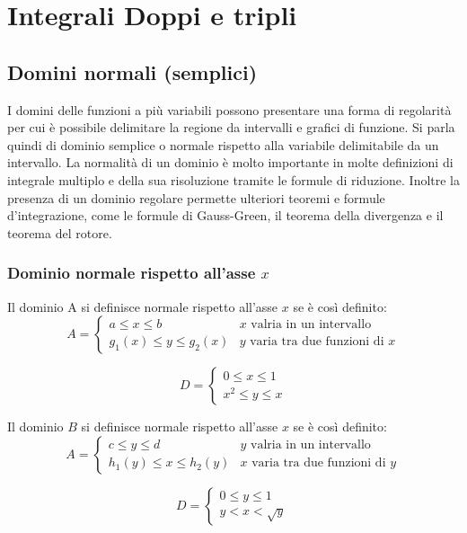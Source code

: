 \chapter{Integrali Doppi e tripli}
\section{Domini normali (semplici)}
\begin{defi}
	I domini delle funzioni a più variabili possono presentare una forma di
	regolarità per cui è possibile delimitare la regione da intervalli e grafici
	di funzione. Si parla quindi di dominio semplice o normale rispetto alla
	variabile delimitabile da un intervallo. La normalità di un dominio è molto
	importante in molte definizioni di integrale multiplo e della sua
	risoluzione tramite le formule di riduzione. Inoltre la presenza di un
	dominio regolare permette ulteriori teoremi e formule d'integrazione, come
	le formule di Gauss-Green, il teorema della divergenza e il teorema del
	rotore.
\end{defi}
\subsection{Dominio normale rispetto all'asse $x$}
Il dominio A si definisce {\color{red} normale} rispetto all'asse $x$ se è così
definito:
\begin{equation}
	A=\begin{cases}
		a\leq x\leq b & x \text{ valria in un intervallo}\\
		g_1(x)\leq y\leq g_2(x) & y \text{ varia tra due funzioni di }x
	\end{cases}
\end{equation}
\begin{esempio}
\begin{equation*}
	D=\begin{cases}
		0\leq x\leq 1\\
		x^2\leq y\leq x
	\end{cases}
\end{equation*}
\end{esempio}
Il dominio $B$ si definisce {\color{red} normale} rispetto all'asse $x$ se è così
definito:
\begin{equation}
	A=\begin{cases}
		c\leq y\leq d & y \text{ valria in un intervallo}\\
		h_1(y)\leq x\leq h_2(y) & x \text{ varia tra due funzioni di }y
	\end{cases}
\end{equation}
\begin{esempio}
\begin{equation*}
	D=\begin{cases}
		0\leq y\leq 1\\
		y< x< \sqrt{y}
	\end{cases}
\end{equation*}
\end{esempio}
